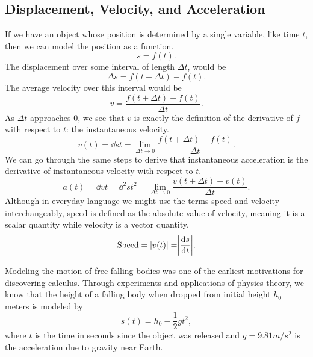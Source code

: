 \subsection{Displacement, Velocity, and Acceleration}
If we have an object whose position is determined by a single variable, like time $t$, then we can model the position as a function.
\begin{equation*}
	s = f(t).
\end{equation*}
The displacement over some interval of length $\Delta t$, would be
\begin{equation*}
	\Delta s = f(t + \Delta t) - f(t).
\end{equation*}
The average velocity over this interval would be
\begin{equation*}
	\bar{v} = \frac{f(t + \Delta t) - f(t)}{\Delta t}.
\end{equation*}
As $\Delta t$ approaches 0, we see that $\bar{v}$ is exactly the definition of the derivative of $f$ with respect to $t$: the instantaneous velocity.
\begin{equation*}
	v(t) = \dd{s}{t} = \lim_{\Delta t \to 0}{\frac{f(t + \Delta t) - f(t)}{\Delta t}}.
\end{equation*}
We can go through the same steps to derive that instantaneous acceleration is the derivative of instantaneous velocity with respect to $t$.
\begin{equation*}
	a(t) = \dd{v}{t} = \dd{{}^2s}{t^2} = \lim_{\Delta t \to 0}{\frac{v(t + \Delta t) - v(t)}{\Delta t}}.
\end{equation*}
Although in everyday language we might use the terms speed and velocity interchangeably, speed is defined as the absolute value of velocity, meaning it is a scalar quantity while velocity is a vector quantity.
\begin{equation*}
	\text{Speed} = \lvert v(t) \rvert = \biggr\lvert \frac{\mathrm{d} s}{\mathrm{d} t} \biggr\rvert.
\end{equation*}

\noindent
Modeling the motion of free-falling bodies was one of the earliest motivations for discovering calculus.
Through experiments and applications of physics theory, we know that the height of a falling body when dropped from initial height $h_0$ meters is modeled by
\begin{equation*}
	s(t) = h_0 - \frac{1}{2}gt^2,
\end{equation*}
where $t$ is the time in seconds since the object was released and $g = 9.81m/s^2$ is the acceleration due to gravity near Earth.

